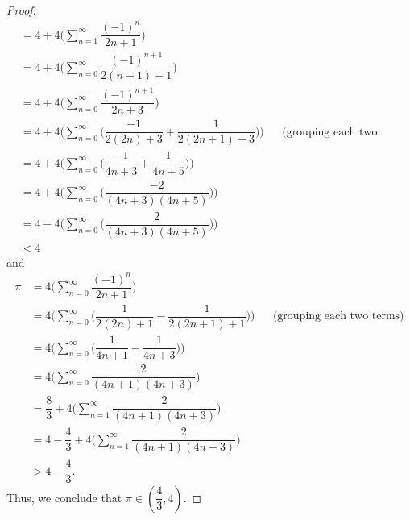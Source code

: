 \begin{proof}
\begin{align*}
        & = 4 + 4 \bigg(\sum_{n = 1}^\infty \dfrac{(-1)^n}{2n + 1}\bigg)                                                                             \\
        & = 4 + 4 \bigg(\sum_{n = 0}^\infty \dfrac{(-1)^{n + 1}}{2(n + 1) + 1}\bigg)                                                                 \\
        & = 4 + 4 \bigg(\sum_{n = 0}^\infty \dfrac{(-1)^{n + 1}}{2n + 3}\bigg)                                                                       \\
        & = 4 + 4 \Bigg(\sum_{n = 0}^\infty \bigg(\dfrac{-1}{2(2n) + 3} + \dfrac{1}{2(2n + 1) + 3}\bigg)\Bigg) &  & \text{(grouping each two terms)} \\
        & = 4 + 4 \Bigg(\sum_{n = 0}^\infty \bigg(\dfrac{-1}{4n + 3} + \dfrac{1}{4n + 5}\bigg)\Bigg)                                                 \\
        & = 4 + 4 \Bigg(\sum_{n = 0}^\infty \bigg(\dfrac{-2}{(4n + 3)(4n + 5)}\bigg)\Bigg)                                                           \\
        & = 4 - 4 \Bigg(\sum_{n = 0}^\infty \bigg(\dfrac{2}{(4n + 3)(4n + 5)}\bigg)\Bigg)                                                            \\
        & < 4
  \end{align*}
  and
  \begin{align*}
    \pi & = 4 \bigg(\sum_{n = 0}^\infty \dfrac{(-1)^n}{2n + 1}\bigg)                                                                            \\
        & = 4 \Bigg(\sum_{n = 0}^\infty \bigg(\dfrac{1}{2(2n) + 1} - \dfrac{1}{2(2n + 1) + 1}\bigg)\Bigg) &  & \text{(grouping each two terms)} \\
        & = 4 \Bigg(\sum_{n = 0}^\infty \bigg(\dfrac{1}{4n + 1} - \dfrac{1}{4n + 3}\bigg)\Bigg)                                                 \\
        & = 4 \bigg(\sum_{n = 0}^\infty \dfrac{2}{(4n + 1)(4n + 3)}\bigg)                                                                       \\
        & = \dfrac{8}{3} + 4 \bigg(\sum_{n = 1}^\infty \dfrac{2}{(4n + 1)(4n + 3)}\bigg)                                                        \\
        & = 4 - \dfrac{4}{3} + 4 \bigg(\sum_{n = 1}^\infty \dfrac{2}{(4n + 1)(4n + 3)}\bigg)                                                    \\
        & > 4 - \dfrac{4}{3}.
  \end{align*}
  Thus, we conclude that \(\pi \in (\dfrac{4}{3}, 4)\).
\end{proof}


